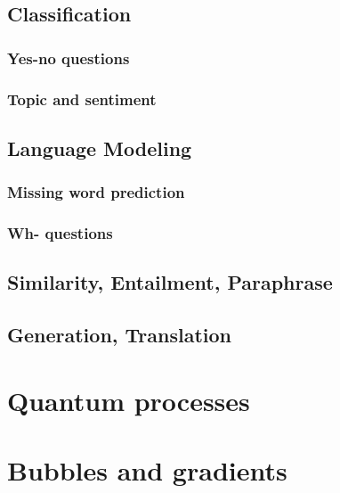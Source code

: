     \section{Classification}
        \subsection{Yes-no questions}
        \subsection{Topic and sentiment}

    \section{Language Modeling}
        \subsection{Missing word prediction}
        \subsection{Wh- questions}

    \section{Similarity, Entailment, Paraphrase}

    \section{Generation, Translation}

\chapter{Quantum processes}



\chapter{Bubbles and gradients}

\nocite{*}

\setlength{\baselineskip}{0pt} %

{\renewcommand*\MakeUppercase[1]{#1}%
\printbibliography[heading=bibintoc,title={\bibtitle}]}


